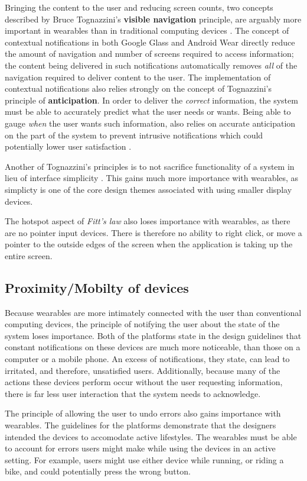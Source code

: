 \documentclass[12pt]{article}
\begin{document}
Bringing the content to the user and reducing screen counts, two concepts described by Bruce Tognazzini's \textbf{visible navigation} principle, are arguably more important in wearables than in traditional computing devices \cite{tog}. The concept of contextual notifications in both Google Glass and Android Wear directly reduce the amount of navigation and number of screens required to access information; the content being delivered in such notifications automatically removes \textit{all} of the navigation required to deliver content to the user. The implementation of contextual notifications also relies strongly on the concept of Tognazzini's principle of \textbf{anticipation}. In order to deliver the \textit{correct} information, the system must be able to accurately predict what the user needs or wants. Being able to gauge \textit{when} the user wants such information, also relies on accurate anticipation on the part of the system to prevent intrusive notifications which could potentially lower user satisfaction \cite{tog}.

Another of Tognazzini's principles is to not sacrifice functionality of a system in lieu of interface simplicity \cite{tog}. This gains much more importance with wearables, as simplicty is one of the core design themes associated with using smaller display devices.

The hotspot aspect of \textit{Fitt's law} also loses importance with wearables, as there are no pointer input devices. There is therefore no ability to right click, or move a pointer to the outside edges of the screen when the application is taking up the entire screen.

\subsection{Proximity/Mobilty of devices}
Because wearables are more intimately connected with the user than conventional computing devices, the principle of notifying the user about the state of the system loses importance. Both of the platforms state in the design guidelines that constant notifications on these devices are much more noticeable, than those on a computer or a mobile phone. An excess of notifications, they state, can lead to irritated, and therefore, unsatisfied users. Additionally, because many of the actions these devices perform occur without the user requesting information, there is far less user interaction that the system needs to acknowledge. 

The principle of allowing the user to undo errors also gains importance with wearables. The guidelines for the platforms demonstrate that the designers intended the devices to accomodate active lifestyles.  The wearables must be able to account for errors users might make while using the devices in an active setting. For example, users might use either device while running, or riding a bike, and could potentially press the wrong button.
\end{document}
